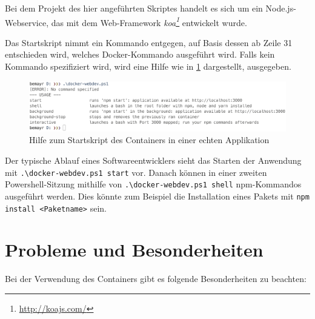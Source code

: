 Bei dem Projekt des hier angeführten Skriptes handelt es sich um ein Node.js-Webservice, das mit dem Web-Framework \emph{koa\footnote{\url{http://koajs.com/}}} entwickelt wurde. 


Das Startskript nimmt ein Kommando entgegen, auf Basis dessen ab Zeile 31 entschieden wird, welches Docker-Kommando ausgeführt wird.
Falls kein Kommando spezifiziert wird, wird eine Hilfe wie in \cref{fig:docker-webdev} dargestellt, ausgegeben.
\begin{figure}[htbp]
    \centering
    \includegraphics[width=0.95\linewidth,clip]{images/docker-webdev}
    \caption{Hilfe zum Startskript des Containers in einer echten Applikation}
\label{fig:docker-webdev}
\end{figure}
Der typische Ablauf eines Softwareentwicklers sieht das Starten der Anwendung mit \verb|.\docker-webdev.ps1 start| vor.
Danach können in einer zweiten Powershell-Sitzung mithilfe von \verb|.\docker-webdev.ps1 shell| npm-Kommandos ausgeführt werden.
Dies könnte zum Beispiel die Installation eines Pakets mit \verb|npm install <Paketname>| sein. 


\section{Probleme und Besonderheiten}
\label{sec:container-problems}
Bei der Verwendung des Containers gibt es folgende Besonderheiten zu beachten:

